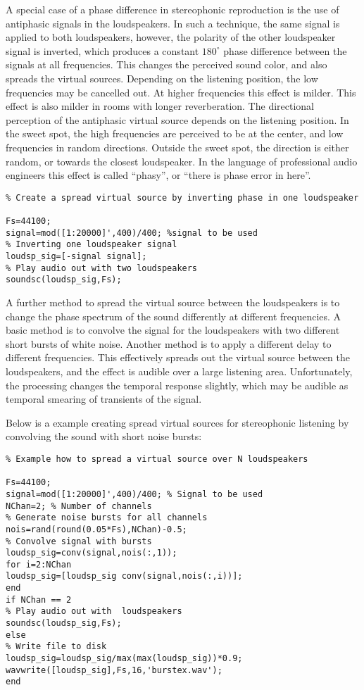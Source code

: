 \documentclass[10pt,a4paper,oneside]{article}
\begin{document}
A special case of a phase difference in stereophonic reproduction is the use of antiphasic signals in the loudspeakers. In such a technique, the same signal is applied to both loudspeakers, however, the polarity of the other loudspeaker signal is inverted, which produces a constant $180^{\circ}$ phase difference between the signals at all frequencies. This changes the perceived sound color, and also spreads the virtual sources. Depending on the listening position, the low frequencies may be cancelled out. At higher frequencies this effect is milder. This effect is also milder in rooms with longer reverberation. The directional perception of the antiphasic virtual source depends on the listening position. In the sweet spot, the high frequencies are perceived to be at the center, and low frequencies in random directions. Outside the sweet spot, the direction is either random, or towards the closest loudspeaker. In the language of professional audio engineers this effect is called “phasy”, or “there is phase error in here”.
\begin{lstlisting}
% Create a spread virtual source by inverting phase in one loudspeaker

Fs=44100;
signal=mod([1:20000]',400)/400; %signal to be used
% Inverting one loudspeaker signal
loudsp_sig=[-signal signal];
% Play audio out with two loudspeakers
soundsc(loudsp_sig,Fs);
\end{lstlisting}

A further method to spread the virtual source between the loudspeakers is to change the phase spectrum of the sound differently at different frequencies. A basic method is to convolve the signal for the loudspeakers with two different short bursts of white noise. Another method is to apply a different delay to different frequencies. This effectively spreads out the virtual source between the loudspeakers, and the effect is audible over a large listening area. Unfortunately, the processing changes the temporal response slightly, which may be audible as temporal smearing of transients of the signal.

Below is a example creating spread virtual sources for stereophonic listening by convolving the sound with short noise bursts:
\begin{lstlisting}
% Example how to spread a virtual source over N loudspeakers

Fs=44100;
signal=mod([1:20000]',400)/400; % Signal to be used
NChan=2; % Number of channels
% Generate noise bursts for all channels
nois=rand(round(0.05*Fs),NChan)-0.5;
% Convolve signal with bursts
loudsp_sig=conv(signal,nois(:,1));
for i=2:NChan
loudsp_sig=[loudsp_sig conv(signal,nois(:,i))];
end
if NChan == 2
% Play audio out with  loudspeakers
soundsc(loudsp_sig,Fs);
else 
% Write file to disk
loudsp_sig=loudsp_sig/max(max(loudsp_sig))*0.9;
wavwrite([loudsp_sig],Fs,16,'burstex.wav');
end
\end{lstlisting}
\end{document}
